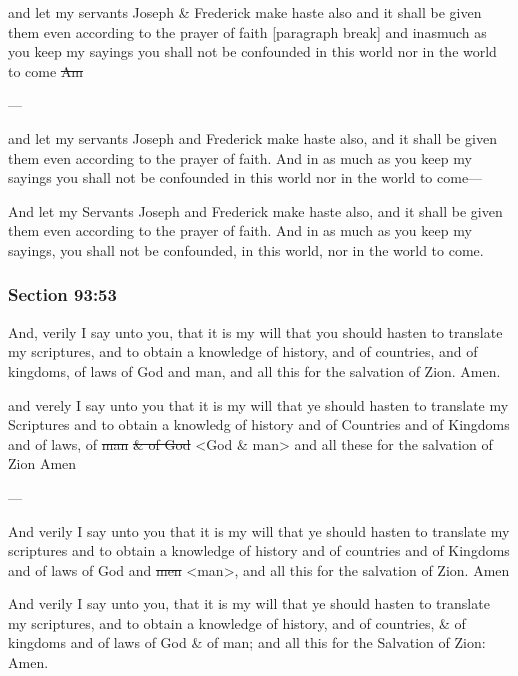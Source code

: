 		\begin{framed}
		\scriptsize
			\begin{compactdesc}
				\item[JSP] and let my servants Joseph \& Frederick make haste also and it shall be given them even according to the prayer of faith [paragraph break] and inasmuch as you keep my sayings you shall not be confounded in this world nor in the world to come \sout{Am}
				\item[BC] ---
				\item[RB2] and let my servants Joseph and Frederick make haste also, and it shall be given them even according to the prayer of faith. And in as much as you keep my sayings you shall not be confounded in this world nor in the world to come--- 
				\item[RB1] And let my Servants Joseph and Frederick make haste also, and it shall be given them even according to the prayer of faith. And in as much as you keep my sayings, you shall not be confounded, in this world, nor in the world to come.
			\end{compactdesc}
		\end{framed}

	\subsubsection{Section 93:53} %
		\label{DC93-53}

		And, verily I say unto you, that it is my will that you should hasten to translate my scriptures, and to obtain a knowledge of history, and of countries, and of kingdoms, of laws of God and man, and all this for the salvation of Zion. Amen.

		\begin{framed}
		\scriptsize
			\begin{compactdesc}
				\item[JSP] and verely I say unto you that it is my will that ye should hasten to translate my Scriptures and to obtain a knowledg of history and of Countries and of Kingdoms and of laws, of \sout{man} \sout{\& of God} <God \& man> and all these for the salvation of Zion Amen
				\item[BC] ---
				\item[RB2] And verily I say unto you that it is my will that ye should hasten to translate my scriptures and to obtain a knowledge of history and of countries and of Kingdoms and of laws of God and \sout{men} <man>, and all this for the salvation of Zion. Amen
				\item[RB1] And verily I say unto you, that it is my will that ye should hasten to translate my scriptures, and to obtain a knowledge of history, and of countries, \& of kingdoms and of laws of God \& of man; and all this for the Salvation of Zion: Amen. 
			\end{compactdesc}
		\end{framed}